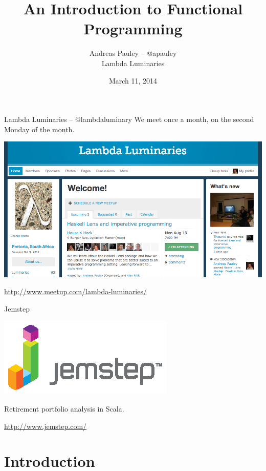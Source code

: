 \documentclass[mathserif]{beamer}
\title[Functional Programming]{An Introduction to Functional Programming}
\author{Andreas Pauley -- @apauley \\ Lambda Luminaries}
\institute{\href{http://www.meetup.com/DeveloperUG/events/139983502/}{DeveloperUG}}
\date{March 11, 2014}
\begin{document}
\begin{frame}
  \titlepage
\end{frame}

\begin{frame}{Lambda Luminaries -- @lambdaluminary}
  We meet once a month, on the second Monday of the month.
  \begin{center}
    \includegraphics[scale=0.3]{img/LambdaLuminariesScreenShot2013-08-09.png}
  \end{center}

  \vskip5mm

  \url{http://www.meetup.com/lambda-luminaries/}
\end{frame}

\begin{frame}{Jemstep}
  \begin{center}
    \includegraphics[scale=2]{img/Jemstep_HD_RGB.eps}
  \end{center}

  Retirement portfolio analysis in Scala.

  \vskip5mm

  \url{http://www.jemstep.com/}
\end{frame}

\section{Introduction}
\end{document}
